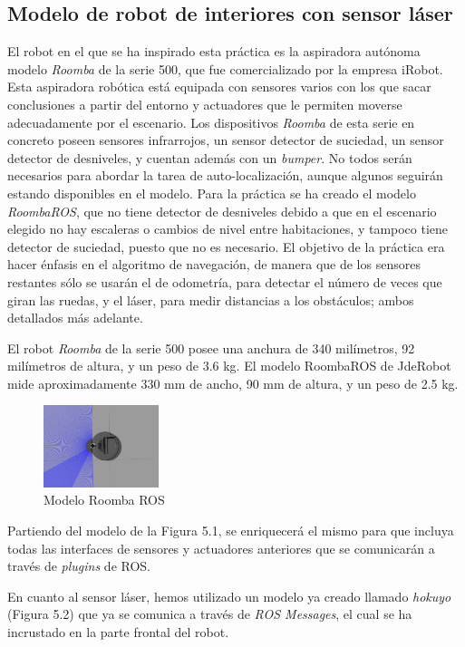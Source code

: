 \subsection{Modelo de robot de interiores con sensor láser}
El robot en el que se ha inspirado esta práctica es la aspiradora autónoma modelo \textit{Roomba} de la serie 500, que fue comercializado por la empresa iRobot. Esta aspiradora robótica está equipada con sensores varios con los que sacar conclusiones a partir del entorno y actuadores que le permiten moverse adecuadamente por el escenario. Los dispositivos \textit{Roomba} de esta serie en concreto poseen sensores infrarrojos, un sensor detector de suciedad, un sensor detector de desniveles, y cuentan además con un \textit{bumper}. No todos serán necesarios para abordar la tarea de auto-localización, aunque algunos seguirán estando disponibles en el modelo. Para la práctica se ha creado el modelo \textit{RoombaROS}, que no tiene detector de desniveles debido a que en el escenario elegido no hay escaleras o cambios de nivel entre habitaciones, y tampoco tiene detector de suciedad, puesto que no es necesario. El objetivo de la práctica era hacer énfasis en el algoritmo de navegación, de manera que de los sensores restantes sólo se usarán el de odometría, para detectar el número de veces que giran las ruedas, y el láser, para medir distancias a los obstáculos; ambos detallados más adelante. 

El robot \textit{Roomba} de la serie 500 posee una anchura de 340 milímetros, 92 milímetros de altura, y un peso de 3.6 kg. El modelo RoombaROS de JdeRobot mide aproximadamente 330 mm de ancho, 90 mm de altura, y un peso de 2.5 kg.

\begin{multicols}{2}
	\begin{figure}[H]
	\begin{center}
		\includegraphics[width=0.3\textwidth]{figures/create.png}
		\caption{Modelo Roomba ROS}
		\label{fig.create}
		\end{center}
\end{figure}

Partiendo del modelo de la Figura 5.1, se enriquecerá el mismo para que incluya todas las interfaces de sensores y actuadores anteriores que se comunicarán a través de \textit{plugins} de ROS.
\end{multicols}
En cuanto al sensor láser, hemos utilizado un modelo ya creado llamado \textit{hokuyo} (Figura 5.2) que ya se comunica a través de \textit{ROS Messages}, el cual se ha incrustado en la parte frontal del robot.

